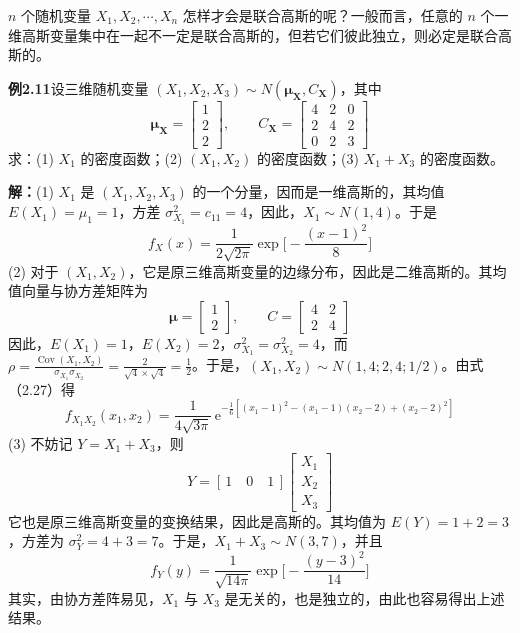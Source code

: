 \documentclass[11pt,openany,UTF8]{ctexbook}
\newcommand{\eu}{\mathrm{e}}                       %
\DeclareMathOperator{\Cov}{Cov}                    %
\newcommand{\bX}{\bm{X}}
\begin{document}
$n$ 个随机变量 $X_1,X_2,\cdots,X_n$ 怎样才会是联合高斯的呢\nobreak？一般而言\nobreak，任意的 $n$ 个一维高斯变量集中在一起不一定是联合高斯的\nobreak，但若它们彼此独立\nobreak，则必定是联合高斯的\nobreak。

\begin{examplebox}
\textbf{例2.11}\quad 设三维随机变量 $(X_1,X_2,X_3)\sim N(\bm{\mu}_{\bX},C_{\bX})$\nobreak，其中
\[
\bm{\mu}_{\bX}=\begin{bmatrix}1\\2\\2\end{bmatrix},\qquad
C_{\bX}=\begin{bmatrix}4 & 2 & 0\\2 & 4 & 2\\0 & 2 & 3\end{bmatrix}
\]
求\nobreak：(1) $X_1$ 的密度函数\nobreak；(2) $(X_1,X_2)$ 的密度函数\nobreak；(3) $X_1+X_3$ 的密度函数\nobreak。

\textbf{解\nobreak：}(1) $X_1$ 是 $(X_1,X_2,X_3)$ 的一个分量\nobreak，因而是一维高斯的\nobreak，其均值 $E(X_1)=\mu_1=1$\nobreak，方差 $\sigma_{X_1}^2=c_{11}=4$\nobreak，因此\nobreak，$X_1\sim N(1,4)$\nobreak。于是
\[
f_X(x)=\frac{1}{2\sqrt{2\pi}}\exp\Biggl[-\frac{(x-1)^2}{8}\Biggr]
\]
(2) 对于 $(X_1,X_2)$\nobreak，它是原三维高斯变量的边缘分布\nobreak，因此是二维高斯的\nobreak。其均值向量与协方差矩阵为
\[
\bm{\mu}=\begin{bmatrix}1\\2\end{bmatrix},\qquad
C=\begin{bmatrix}4 & 2\\2 & 4\end{bmatrix}
\]
因此\nobreak，$E(X_1)=1$\nobreak，$E(X_2)=2$\nobreak，$\sigma_{X_1}^2=\sigma_{X_2}^2=4$\nobreak，而
$\displaystyle\rho=\frac{\Cov(X_1,X_2)}{\sigma_{X_1}\sigma_{X_2}}
=\frac{2}{\sqrt{4}\times\sqrt{4}}=\frac{1}{2}$\nobreak。于是\nobreak，$(X_1,X_2)\sim N(1,4;2,4;1/2)$\nobreak。由式\nobreak（2.27\nobreak）得
\[
f_{X_1X_2}(x_1,x_2)=\frac{1}{4\sqrt{3\pi}}\,
\eu^{-\frac{1}{6}[(x_1-1)^2-(x_1-1)(x_2-2)+(x_2-2)^2]}
\]
(3) 不妨记 $Y=X_1+X_3$\nobreak，则
\[
Y=[\,1\quad 0\quad 1\,]\begin{bmatrix}X_1\\X_2\\X_3\end{bmatrix}
\]
它也是原三维高斯变量的变换结果\nobreak，因此是高斯的\nobreak。其均值为 $E(Y)=1+2=3$\nobreak，方差为 $\sigma_Y^2=4+3=7$\nobreak。于是\nobreak，$X_1+X_3\sim N(3,7)$\nobreak，并且
\[
f_Y(y)=\frac{1}{\sqrt{14\pi}}\exp\Biggl[-\frac{(y-3)^2}{14}\Biggr]
\]
其实\nobreak，由协方差阵易见\nobreak，$X_1$ 与 $X_3$ 是无关的\nobreak，也是独立的\nobreak，由此也容易得出上述结果\nobreak。
\end{examplebox}
\end{document}
